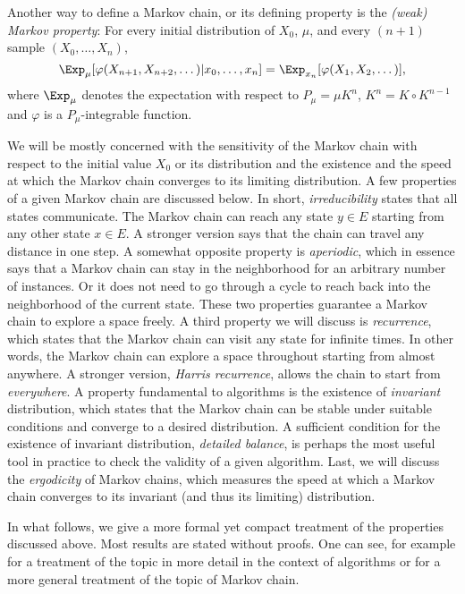Another way to define a Markov chain, or its defining property is the
\emph{(weak) Markov property}: For every initial distribution of $X_0$, $\mu$,
and every $(n+1)$ sample $(X_0,\dots,X_n)$,
\begin{equation}
  \Exp_{\mu}[\varphi(X_{n+1},X_{n+2},\dots)|x_0,\dots,x_n] =
  \Exp_{x_n}[\varphi(X_1,X_2,\dots)],
\end{equation}
where $\Exp_{\mu}$ denotes the expectation with respect to $P_{\mu} = \mu
K^n$, $K^n = K\vysmwhtcircle K^{n-1}$ and $\varphi$ is a $P_{\mu}$-integrable
function.

We will be mostly concerned with the sensitivity of the Markov chain with
respect to the initial value $X_0$ or its distribution and the existence and
the speed at which the Markov chain converges to its limiting distribution. A
few properties of a given Markov chain are discussed below. In short,
\emph{irreducibility} states that all states communicate. The Markov chain can
reach any state $y\in E$ starting from any other state $x\in E$. A stronger
version says that the chain can travel any distance in one step. A somewhat
opposite property is \emph{aperiodic}, which in essence says that a Markov
chain can stay in the neighborhood for an arbitrary number of instances. Or it
does not need to go through a cycle to reach back into the neighborhood of the
current state. These two properties guarantee a Markov chain to explore a
space freely. A third property we will discuss is \emph{recurrence}, which
states that the Markov chain can visit any state for infinite times. In other
words, the Markov chain can explore a space throughout starting from almost
anywhere. A stronger version, \emph{Harris recurrence}, allows the chain to
start from \emph{everywhere}. A property fundamental to \mcmc algorithms is
the existence of \emph{invariant} distribution, which states that the Markov
chain can be stable under suitable conditions and converge to a desired
distribution. A sufficient condition for the existence of invariant
distribution, \emph{detailed balance}, is perhaps the most useful tool in
practice to check the validity of a given algorithm. Last, we will discuss the
\emph{ergodicity} of Markov chains, which measures the speed at which a Markov
chain converges to its invariant (and thus its limiting) distribution.

In what follows, we give a more formal yet compact treatment of the properties
discussed above. Most results are stated without proofs. One can see, for
example \cite[][chap.~6]{Robert:2004tn} for a treatment of the topic in more
detail in the context of \mcmc algorithms or \cite{Meyn1993} for a more
general treatment of the topic of Markov chain.

